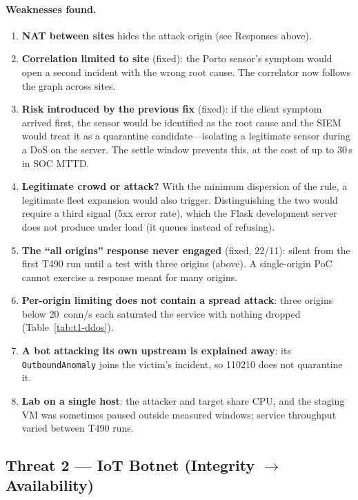\documentclass[11pt,a4paper]{article}
\begin{document}
\paragraph{Weaknesses found.}
\begin{enumerate}
  \item \textbf{NAT between sites} hides the attack origin (see Responses above).
  \item \textbf{Correlation limited to site} (fixed): the Porto sensor's symptom would open a
    second incident with the wrong root cause. The correlator now follows the graph across sites.
  \item \textbf{Risk introduced by the previous fix} (fixed): if the client symptom arrived
    first, the sensor would be identified as the root cause and the SIEM would treat it as a
    quarantine candidate---isolating a legitimate sensor during a DoS on the server. The
    settle window prevents this, at the cost of up to 30\,s in SOC MTTD.
  \item \textbf{Legitimate crowd or attack?} With the minimum dispersion of the rule, a
    legitimate fleet expansion would also trigger. Distinguishing the two would require a
    third signal (5xx error rate), which the Flask development server does not produce under
    load (it queues instead of refusing).
  \item \textbf{The ``all origins'' response never engaged} (fixed, 22/11): silent from the
    first T490 run until a test with three origins (above). A single-origin PoC cannot exercise
    a response meant for many origins.
  \item \textbf{Per-origin limiting does not contain a spread attack}: three origins below
    20~conn/s each saturated the service with nothing dropped (Table~\ref{tab:t1-ddos}).
  \item \textbf{A bot attacking its own upstream is explained away}: its
    \texttt{OutboundAnomaly} joins the victim's incident, so 110210 does not quarantine it.
  \item \textbf{Lab on a single host}: the attacker and target share CPU, and the staging VM
    was sometimes paused outside measured windows; service throughput varied between T490 runs.
\end{enumerate}


\subsection{Threat 2 --- IoT Botnet (Integrity $\to$ Availability)}
\label{sec:t2}
\end{document}
